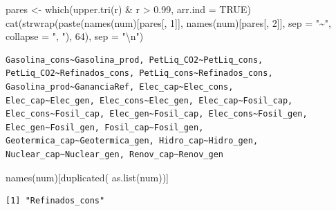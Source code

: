\documentclass[oneside, openany, fontset=libertinus]{mitthesis}
\newenvironment{Shaded}{\begin{snugshade}}{\end{snugshade}}
\newcommand{\AttributeTok}[1]{\textcolor[rgb]{0.40,0.45,0.13}{#1}}
\newcommand{\ConstantTok}[1]{\textcolor[rgb]{0.56,0.35,0.01}{#1}}
\newcommand{\DecValTok}[1]{\textcolor[rgb]{0.68,0.00,0.00}{#1}}
\newcommand{\FloatTok}[1]{\textcolor[rgb]{0.68,0.00,0.00}{#1}}
\newcommand{\FunctionTok}[1]{\textcolor[rgb]{0.28,0.35,0.67}{#1}}
\newcommand{\NormalTok}[1]{\textcolor[rgb]{0.00,0.23,0.31}{#1}}
\newcommand{\OtherTok}[1]{\textcolor[rgb]{0.00,0.23,0.31}{#1}}
\newcommand{\SpecialCharTok}[1]{\textcolor[rgb]{0.37,0.37,0.37}{#1}}
\newcommand{\StringTok}[1]{\textcolor[rgb]{0.13,0.47,0.30}{#1}}
\newenvironment{codres}%
  {\par\smallskip\noindent\begin{minipage}[t]{0.57\linewidth}\vspace{0pt}}%
  {\end{minipage}\par\medskip}
\newcommand{\codressep}{\end{minipage}\hfill\begin{minipage}[t]{0.40\linewidth}\vspace{0pt}}
\begin{document}
\Needspace{2.09in}

\begin{Shaded}
\begin{Highlighting}[]
\NormalTok{pares }\OtherTok{\textless{}{-}} \FunctionTok{which}\NormalTok{(}\FunctionTok{upper.tri}\NormalTok{(r) }\SpecialCharTok{\&}\NormalTok{ r }\SpecialCharTok{\textgreater{}} \FloatTok{0.99}\NormalTok{, }\AttributeTok{arr.ind =} \ConstantTok{TRUE}\NormalTok{)}
\FunctionTok{cat}\NormalTok{(}\FunctionTok{strwrap}\NormalTok{(}\FunctionTok{paste}\NormalTok{(}\FunctionTok{names}\NormalTok{(num)[pares[, }\DecValTok{1}\NormalTok{]], }\FunctionTok{names}\NormalTok{(num)[pares[, }\DecValTok{2}\NormalTok{]],}
                  \AttributeTok{sep =} \StringTok{"\textasciitilde{}"}\NormalTok{, }\AttributeTok{collapse =} \StringTok{", "}\NormalTok{), }\DecValTok{64}\NormalTok{), }\AttributeTok{sep =} \StringTok{"}\SpecialCharTok{\textbackslash{}n}\StringTok{"}\NormalTok{)}
\end{Highlighting}
\end{Shaded}

\begin{verbatim}
Gasolina_cons~Gasolina_prod, PetLiq_CO2~PetLiq_cons,
PetLiq_CO2~Refinados_cons, PetLiq_cons~Refinados_cons,
Gasolina_prod~GananciaRef, Elec_cap~Elec_cons,
Elec_cap~Elec_gen, Elec_cons~Elec_gen, Elec_cap~Fosil_cap,
Elec_cons~Fosil_cap, Elec_gen~Fosil_cap, Elec_cons~Fosil_gen,
Elec_gen~Fosil_gen, Fosil_cap~Fosil_gen,
Geotermica_cap~Geotermica_gen, Hidro_cap~Hidro_gen,
Nuclear_cap~Nuclear_gen, Renov_cap~Renov_gen
\end{verbatim}

\Needspace{2.47in}

\begin{codres}

\begin{Shaded}
\begin{Highlighting}[]
\FunctionTok{names}\NormalTok{(num)[}\FunctionTok{duplicated}\NormalTok{(}
  \FunctionTok{as.list}\NormalTok{(num))]}
\end{Highlighting}
\end{Shaded}

\codressep

\begin{verbatim}
[1] "Refinados_cons"
\end{verbatim}

\end{codres}
\end{document}
